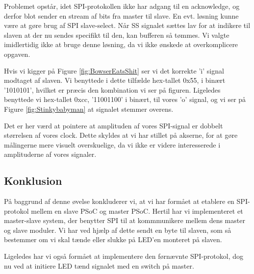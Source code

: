 \documentclass[../main.tex]{subfiles}
\begin{document}
Problemet opstår, idet SPI-protokollen ikke har adgang til en acknowledge, og derfor blot sender en stream af bits fra master til slave. En evt. løsning kunne være at gøre brug af 
SPI slave-select. Når SS signalet sættes lav for at indikere til slaven at der nu sendes specifikt til den, kan bufferen så tømmes. Vi valgte imidlertidig ikke at bruge denne løsning,
da vi ikke ønskede at overkomplicere opgaven.

Hvis vi kigger på Figure \ref{fig:BowserEatsShit} ser vi det korrekte 'i' signal modtaget af slaven. Vi benyttede i dette tilfælde hex-tallet 0x55, i binært '1010101', hvilket er præcis 
den kombination vi ser på figuren. Ligeledes benyttede vi hex-tallet 0xcc, '11001100' i binært, til vores 'o' signal, og vi ser på Figure \ref{fig:Stinkybabyman} at signalet stemmer overens.

Det er her værd at pointere at amplituden af vores SPI-signal er dobbelt størrelsen af vores clock. Dette skyldes at vi har stillet på akserne, for at gøre målingerne mere visuelt
 overskuelige, da vi ikke er videre interesserede i amplituderne af vores signaler.

\subsection{Konklusion}
På baggrund af denne øvelse konkluderer vi, at vi har formået at etablere en SPI-protokol mellem en slave PSoC og master PSoC. 
Hertil har vi implementeret et master-slave system, der benytter SPI til at kommmunikere mellem dens master og slave moduler. 
Vi har ved hjælp af dette sendt en byte til slaven, som så bestemmer om vi skal tænde eller slukke på LED'en monteret på slaven.

Ligeledes har vi også formået at implementere den førnævnte SPI-protokol, dog nu ved at initiere LED tænd signalet med en switch på master.
\end{document}
